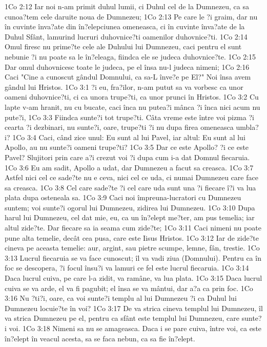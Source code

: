 1Co 2:12  Iar noi n-am primit duhul lumii, ci Duhul cel de la Dumnezeu, ca sa cunoa?tem cele daruite noua de Dumnezeu;
1Co 2:13  Pe care le ?i graim, dar nu în cuvinte înva?ate din în?elepciunea omeneasca, ci în cuvinte înva?ate de la Duhul Sfânt, lamurind lucruri duhovnice?ti oamenilor duhovnice?ti.
1Co 2:14  Omul firesc nu prime?te cele ale Duhului lui Dumnezeu, caci pentru el sunt nebunie ?i nu poate sa le în?eleaga, fiindca ele se judeca duhovnice?te.
1Co 2:15  Dar omul duhovnicesc toate le judeca, pe el însa nu-l judeca nimeni;
1Co 2:16  Caci "Cine a cunoscut gândul Domnului, ca sa-L înve?e pe El?" Noi însa avem gândul lui Hristos.
1Co 3:1  ?i eu, fra?ilor, n-am putut sa va vorbesc ca unor oameni duhovnice?ti, ci ca unora trupe?ti, ca unor prunci în Hristos.
1Co 3:2  Cu lapte v-am hranit, nu cu bucate, caci înca nu putea?i mânca ?i înca nici acum nu pute?i,
1Co 3:3  Fiindca sunte?i tot trupe?ti. Câta vreme este între voi pizma ?i cearta ?i dezbinari, nu sunte?i, oare, trupe?ti ?i nu dupa firea omeneasca umbla?i?
1Co 3:4  Caci, când zice unul: Eu sunt al lui Pavel, iar altul: Eu sunt al lui Apollo, au nu sunte?i oameni trupe?ti?
1Co 3:5  Dar ce este Apollo? ?i ce este Pavel? Slujitori prin care a?i crezut voi ?i dupa cum i-a dat Domnul fiecaruia.
1Co 3:6  Eu am sadit, Apollo a udat, dar Dumnezeu a facut sa creasca.
1Co 3:7  Astfel nici cel ce sade?te nu e ceva, nici cel ce uda, ci numai Dumnezeu care face sa creasca.
1Co 3:8  Cel care sade?te ?i cel care uda sunt una ?i fiecare î?i va lua plata dupa osteneala sa.
1Co 3:9  Caci noi împreuna-lucratori cu Dumnezeu suntem; voi sunte?i ogorul lui Dumnezeu, zidirea lui Dumnezeu.
1Co 3:10  Dupa harul lui Dumnezeu, cel dat mie, eu, ca un în?elept me?ter, am pus temelia; iar altul zide?te. Dar fiecare sa ia seama cum zide?te;
1Co 3:11  Caci nimeni nu poate pune alta temelie, decât cea pusa, care este Iisus Hristos.
1Co 3:12  Iar de zide?te cineva pe aceasta temelie: aur, argint, sau pietre scumpe, lemne, fân, trestie.
1Co 3:13  Lucrul fiecaruia se va face cunoscut; îl va vadi ziua (Domnului). Pentru ca în foc se descopera, ?i focul însu?i va lamuri ce fel este lucrul fiecaruia.
1Co 3:14  Daca lucrul cuiva, pe care l-a zidit, va ramâne, va lua plata.
1Co 3:15  Daca lucrul cuiva se va arde, el va fi pagubit; el însa se va mântui, dar a?a ca prin foc.
1Co 3:16  Nu ?ti?i, oare, ca voi sunte?i templu al lui Dumnezeu ?i ca Duhul lui Dumnezeu locuie?te în voi?
1Co 3:17  De va strica cineva templul lui Dumnezeu, îl va strica Dumnezeu pe el, pentru ca sfânt este templul lui Dumnezeu, care sunte?i voi.
1Co 3:18  Nimeni sa nu se amageasca. Daca i se pare cuiva, între voi, ca este în?elept în veacul acesta, sa se faca nebun, ca sa fie în?elept.
